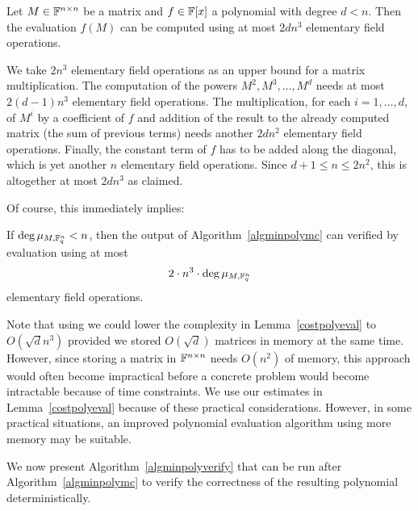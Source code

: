 \begin{Lemm}
\label{costpolyeval}
Let $M \in \mathbb{F}^{n \times n}$ be a matrix and $f \in \mathbb{F}[x]$ a polynomial 
with degree $d < n$. Then the evaluation $f(M)$ can be computed using
at most $2dn^3$ elementary field operations.
\end{Lemm}

\proofbeg We take $2n^3$ elementary field operations as an upper bound for a matrix
multiplication. The computation of the powers $M^2, M^3, \ldots, M^d$
needs at most $2(d-1)n^3$ elementary field operations. The
multiplication, for each $i=1,\dots,d$, of $M^i$ by a coefficient of $f$
and addition of the result to the already computed matrix (the sum of previous terms) 
needs another $2dn^2$ elementary field operations. Finally, the
constant term of $f$ has to be added along the diagonal, which is yet
another $n$ elementary field operations. Since $d+1\le n \le 2 n^2$, 
this is altogether at most $2dn^3$
as claimed.
\proofend

\smallskip
Of course, this immediately implies:

\begin{Cor}
If $\deg \mu_{M,\mathbb{F}_q^n} < n$, then the output of Algorithm~\ref{algminpolymc} 
can verified by evaluation using at most 
\[ 2\cdot n^3 \cdot \deg \mu_{M,\mathbb{F}_q^n} \] 
elementary field operations.
\end{Cor}

\begin{Rem}
Note that using \cite[Theorem 2]{AC97} we could lower the complexity
in Lemma~\ref{costpolyeval} to $O(\sqrt d n^3)$ provided we 
stored $O(\sqrt d)$ matrices in memory at the same time. However, since
storing a matrix in $\mathbb{F}^{n \times n}$ needs $O(n^2)$ of memory, this
approach would often become impractical before  a
concrete problem would become intractable because of time constraints. 
We use our estimates in Lemma~\ref{costpolyeval} because of
these practical considerations.
However, in some practical situations, an improved polynomial evaluation
algorithm using more memory may be suitable.
\end{Rem}

We now present Algorithm~\ref{algminpolyverify} that can be run after
Algorithm~\ref{algminpolymc} to verify the correctness of the resulting
polynomial deterministically.

